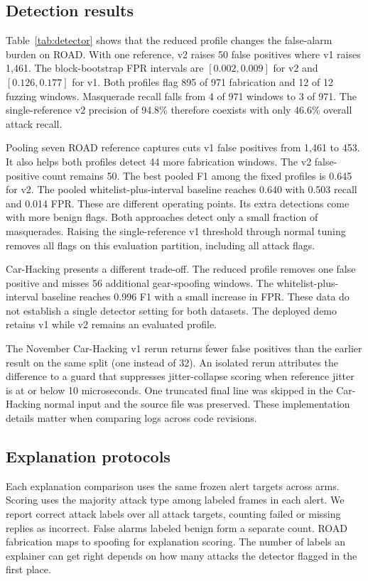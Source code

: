 \documentclass[sigconf,pbalance=true]{acmart}
\begin{document}
\subsection{Detection results}

Table~\ref{tab:detector} shows that the reduced profile changes the false-alarm burden on ROAD. With one reference, v2 raises 50 false positives where v1 raises 1,461. The block-bootstrap FPR intervals are $[0.002,0.009]$ for v2 and $[0.126,0.177]$ for v1. Both profiles flag 895 of 971 fabrication and 12 of 12 fuzzing windows. Masquerade recall falls from 4 of 971 windows to 3 of 971. The single-reference v2 precision of 94.8\% therefore coexists with only 46.6\% overall attack recall.

Pooling seven ROAD reference captures cuts v1 false positives from 1,461 to 453. It also helps both profiles detect 44 more fabrication windows. The v2 false-positive count remains 50. The best pooled F1 among the fixed profiles is 0.645 for v2. The pooled whitelist-plus-interval baseline reaches 0.640 with 0.503 recall and 0.014 FPR. These are different operating points. Its extra detections come with more benign flags. Both approaches detect only a small fraction of masquerades. Raising the single-reference v1 threshold through normal tuning removes all flags on this evaluation partition, including all attack flags.

Car-Hacking presents a different trade-off. The reduced profile removes one false positive and misses 56 additional gear-spoofing windows. The whitelist-plus-interval baseline reaches 0.996 F1 with a small increase in FPR. These data do not establish a single detector setting for both datasets. The deployed demo retains v1 while v2 remains an evaluated profile.

The November Car-Hacking v1 rerun returns fewer false positives than the earlier result on the same split (one instead of 32). An isolated rerun attributes the difference to a guard that suppresses jitter-collapse scoring when reference jitter is at or below 10 microseconds. One truncated final line was skipped in the Car-Hacking normal input and the source file was preserved. These implementation details matter when comparing logs across code revisions.

\subsection{Explanation protocols}

Each explanation comparison uses the same frozen alert targets across arms. Scoring uses the majority attack type among labeled frames in each alert. We report correct attack labels over all attack targets, counting failed or missing replies as incorrect. False alarms labeled benign form a separate count. ROAD fabrication maps to spoofing for explanation scoring. The number of labels an explainer can get right depends on how many attacks the detector flagged in the first place.
\end{document}
